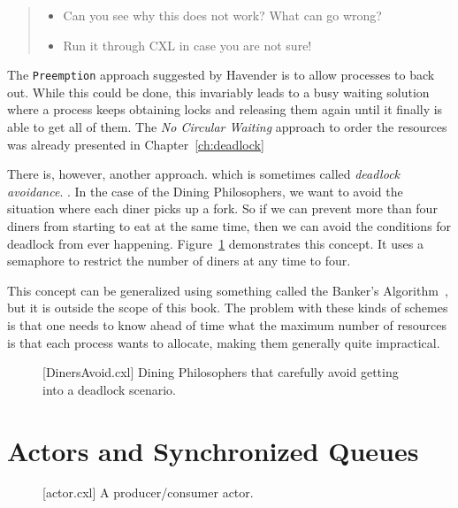 \documentclass{report}
\newenvironment{code}{
\tcolorbox
}{
\endtcolorbox
}
\begin{document}
\begin{quote}
\begin{itemize}
\item Can you see why this does not work?  What can go wrong?
\item Run it through CXL in case you are not sure!
\end{itemize}
\end{quote}

The \texttt{Preemption} approach suggested by Havender is to allow processes to back out.
While this could be done, this invariably leads to a busy waiting solution
where a process keeps obtaining locks and releasing them again until it
finally is able to get all of them.
The \emph{No Circular Waiting} approach to order the resources was already presented in
Chapter~\ref{ch:deadlock}

There is, however, another approach. which is sometimes called
\emph{deadlock avoidance}.
.
In the case of the Dining Philosophers, we want to avoid the situation where each
diner picks up a fork.  So if we can prevent more than four diners from starting to
eat at the same time, then we can avoid the conditions for deadlock from ever
happening.
Figure~\ref{fig:dinersavoid} demonstrates this concept.  It uses a semaphore to
restrict the number of diners at any time to four.

This concept can be generalized using something called the
Banker's Algorithm~\cite{EWD108}, but it is outside the scope of this book.
The problem with these kinds of schemes is that one needs to know ahead of time
what the maximum number of resources is that each process wants to allocate,
making them generally quite impractical.

\begin{figure}
\begin{code}
\end{code}
\caption{[DinersAvoid.cxl] Dining Philosophers that carefully avoid getting into a deadlock
scenario.}
\label{fig:dinersavoid}
\end{figure}

\chapter{Actors and Synchronized Queues}
\label{ch:actor}

\begin{figure}
\begin{code}
\end{code}
\caption{[actor.cxl] A producer/consumer actor.}
\label{fig:actor}
\end{figure}
\end{document}
